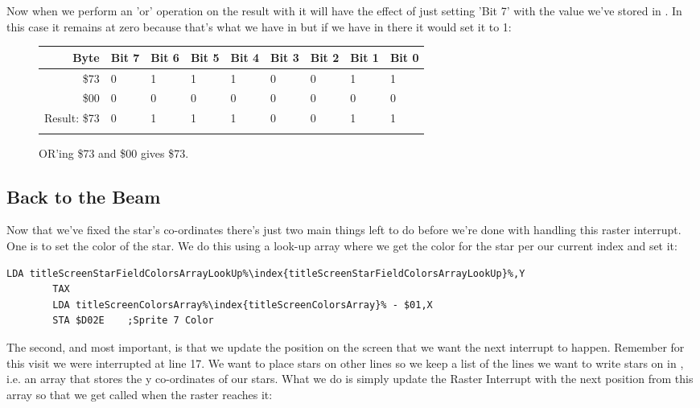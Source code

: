 Now when we perform an 'or' operation on the result with  it will have the effect of just setting 'Bit 7'
with the value we've stored in . In this case it remains at zero because that's what we have in
 but if we have  in there it would set it to 1: 

\begin{figure}[H]
  {
    \setlength{\tabcolsep}{3.0pt}
    \setlength\cmidrulewidth{\heavyrulewidth} %
    \begin{adjustbox}{width=10cm,center}

      \begin{tabular}{rllllllll}
        \toprule
        Byte & Bit 7 & Bit 6 & Bit 5 & Bit 4 & Bit 3 & Bit 2 & Bit 1 & Bit 0        \\
        \midrule
        \$73 & 0 & 1 & 1 & 1 & 0 & 0 & 1 & 1 \\
        \$00 & 0 & 0 & 0 & 0 & 0 & 0 & 0 & 0 \\
        \midrule
        Result: \$73 & 0 & 1 & 1 & 1 & 0 & 0 & 1 & 1 \\
        \addlinespace
        \bottomrule
      \end{tabular}
    \end{adjustbox}
  }\caption*{OR'ing \$73 and \$00 gives \$73.}
\end{figure}

\subsection{Back to the Beam}
Now that we've fixed the star's co-ordinates there's just two main things left to do before we're done with
handling this raster interrupt. One is to set the color of the star. We do this using a look-up array
where we get the color for the star per our current index and set it:

\begin{lstlisting}[escapechar=\%]
        LDA titleScreenStarFieldColorsArrayLookUp%\index{titleScreenStarFieldColorsArrayLookUp}%,Y
        TAX
        LDA titleScreenColorsArray%\index{titleScreenColorsArray}% - $01,X
        STA $D02E    ;Sprite 7 Color
\end{lstlisting}

The second, and most important, is that we update the position on the screen that we want the next interrupt to
happen. Remember for this visit we were interrupted at line 17. We want to place stars on other lines so we keep
a list of the lines we want to write stars on in , i.e. an array that
stores the y co-ordinates of our stars. What we do is simply update the Raster Interrupt with the next position
from this array so that we get called when the raster reaches it:

